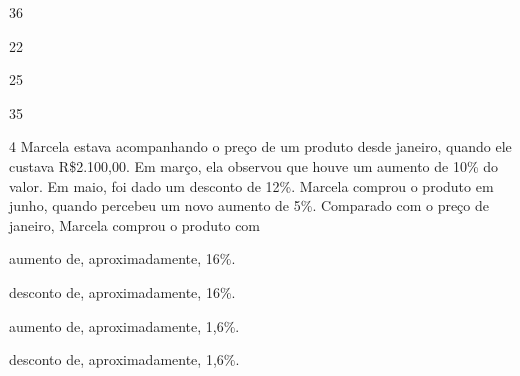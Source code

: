 \begin{escolha}
\item 36
\item 22
\item 25
\item 35
\end{escolha}



\num{4} Marcela estava acompanhando o preço de um produto desde janeiro,
quando ele custava R\$2.100,00. Em março, ela observou que houve um
aumento de 10\% do valor. Em maio, foi dado um desconto de 12\%. Marcela
comprou o produto em junho, quando percebeu um novo aumento de 5\%.
Comparado com o preço de janeiro, Marcela comprou o produto com

\begin{escolha}
\item aumento de, aproximadamente, 16\%.
\item desconto de, aproximadamente, 16\%.
\item aumento de, aproximadamente, 1,6\%.
\item desconto de, aproximadamente, 1,6\%.
\end{escolha}



